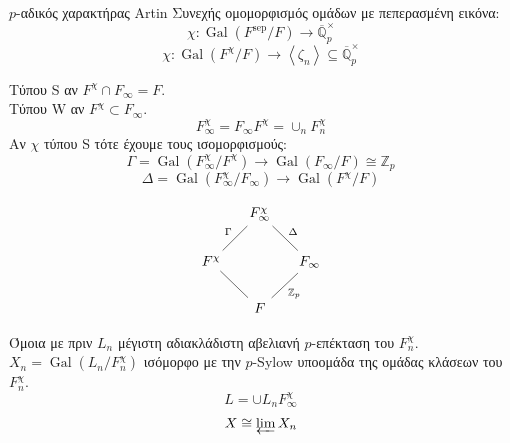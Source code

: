 \documentclass{beamer}
\newcommand {\tl}{\textlatin}
\newcommand{\Gal}{\operatorname{Gal}}
\newcommand{\Q}{\mathbb{Q}}
\newcommand{\Z}{\mathbb{Z}}
\begin{document}
\begin{frame}
\begin{block}{$p$-αδικός χαρακτήρας \tl{Artin}}
Συνεχής ομομορφισμός ομάδων με πεπερασμένη εικόνα:
$$\chi : \Gal(F^{\operatorname{sep}}/F) \longrightarrow \overline{\Q}_p^\times$$
$$\chi: \Gal(F^\chi/F) \longrightarrow \left< \zeta_n \right> \subseteq \overline{\Q}_p^\times$$ 

Τύπου \tl{S} αν $F^\chi \cap F_\infty = F$. \\
Τύπου \tl{W} αν $F^\chi \subset F_\infty$.
$$F^\chi_\infty = F_\infty F^\chi = \cup_n F^\chi_n$$
Αν $\chi$ τύπου \tl{S} τότε έχουμε τους ισομορφισμούς:
$$\Gamma = \Gal(F^\chi_\infty/F^\chi) \longrightarrow \Gal(F_\infty/F)\cong \Z_p$$ 
$$\Delta = \Gal(F^\chi_\infty/F_\infty) \longrightarrow \Gal(F^\chi/F)$$




\end{block}
\end{frame}

\begin{frame}

\[
\centering
\begin{tikzcd}[ampersand replacement=\&, column sep=small]
        \& F^\chi_\infty                                      \&                                         \\
F^\chi \arrow[ru, "\Gamma", no head] \&                                                    \& F_\infty \arrow[lu, "\Delta"', no head] \\
        \& F \arrow[ru, "\Z_p"', no head] \arrow[lu, no head] \&                                        
\end{tikzcd}
\]

\begin{block}{Όμοια με πριν}
$L_n$ μέγιστη αδιακλάδιστη αβελιανή $p$-επέκταση του $F_n^\chi$. $X_n = \Gal(L_n/F^\chi_n)$ ισόμορφο με την $p$-\tl{Sylow} υποομάδα της ομάδας κλάσεων του $F^\chi_n$.\\
$$L = \cup L_n F^\chi_\infty$$
$$X \cong \varprojlim X_n $$
\end{block}
\end{frame}
\end{document}
